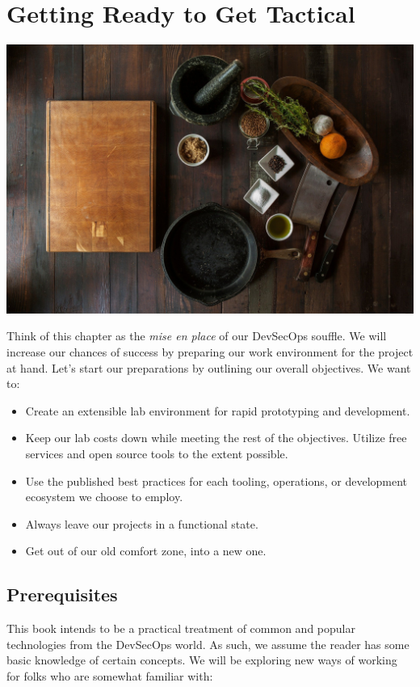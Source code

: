\chapter{Getting Ready to Get Tactical}

\centering
\includegraphics[scale=0.20]{images/ingredients-498199_1920.jpg}


\justify{}
Think of this chapter as the \emph{mise en place} of our DevSecOps souffle. We will increase our chances of success
by preparing our work environment for the project at hand. Let's start our preparations by outlining our
overall objectives. We want to:

\justify{}
\begin{itemize}
	\item
	      Create an extensible lab environment for rapid prototyping and development.
	\item
	      Keep our lab costs down while meeting the rest of the objectives.
	      Utilize free services and open source tools to the extent possible.
	\item
	      Use the published best practices for each tooling, operations, or
	      development ecosystem we choose to employ.
	\item
	      Always leave our projects in a functional state.
	\item
	      Get out of our old comfort zone, into a new one.
\end{itemize}

\section{Prerequisites}

\justify{}
This book intends to be a practical treatment of common and popular technologies from the DevSecOps world. As such, we assume
the reader has some basic knowledge of certain concepts. We will be exploring new ways of working for folks who
are somewhat familiar with:


